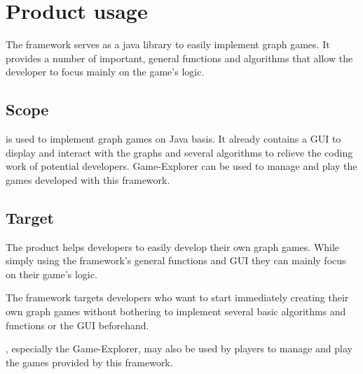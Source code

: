\section{Product usage}
The \gls{framework} serves as a \Gls{java} \gls{library} to easily implement \gls{graph} \glspl{game}. It provides a number of important, general functions and \glspl{algorithm} that allow the \gls{developer} to focus mainly on the game's logic.

\subsection{Scope}
\graphioli is used to implement graph games on Java basis. It already contains a \gls{GUI} to display and interact with the graphs and several algorithms to relieve the coding work of potential developers. \graphioli Game-Explorer can be used to manage and play the games developed with this framework.

\subsection{Target}
The product helps developers to easily develop their own graph games. While simply using the framework's general functions and GUI they can mainly focus on their game's logic. \par
The framework targets developers who want to start immediately creating their own graph games without bothering to implement several basic algorithms and functions or the GUI beforehand. \par
\graphioli, especially the Game-Explorer, may also be used by \glspl{player} to manage and play the games provided by this framework.